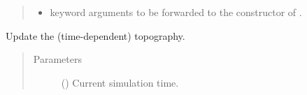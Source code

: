 \documentclass[letterpaper,10pt,english]{sphinxmanual}
\begin{document}
\begin{fulllineitems}
\begin{fulllineitems}
\begin{quote}
\begin{description}
\begin{itemize}
\item {} 
 \textendash{} keyword arguments to be forwarded to the constructor of
{\hyperref[\detokenize{api:grids.topography.Topography1d}]{}}.

\end{itemize}

\end{description}\end{quote}

\end{fulllineitems}


\begin{fulllineitems}
\label{\detokenize{api:grids.xz_grid.XZGrid.update_topography}}
Update the (time-dependent) topography.
\begin{quote}\begin{description}
\item[{Parameters}] \leavevmode
{} () \textendash{} Current simulation time.

\end{description}\end{quote}

\end{fulllineitems}


\end{fulllineitems}

\end{document}

